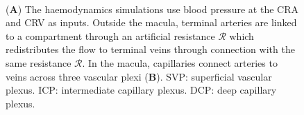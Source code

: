 \documentclass[11pt,]{article}
\begin{document}
\begin{figure}[ht!]
  \centering
  \begin{subfigure}[t]{.02\textwidth}
  \end{subfigure}
  \begin{subfigure}[t]{.95\textwidth}
    {
      \fontsize{3pt}{4pt}\selectfont%
      \def\svgwidth{\textwidth}    
    }
  \end{subfigure}
  \\
  \begin{subfigure}[t]{.02\textwidth}
  \end{subfigure}
  \begin{subfigure}[t]{.95\textwidth}
  \end{subfigure}

  \caption{ %
    (\textbf{A}) The haemodynamics simulations use blood pressure at the CRA and CRV as inputs.
    Outside the macula, terminal arteries are linked to a compartment through an artificial resistance $\mathcal{R}$
    which redistributes the flow to terminal veins through connection with the same resistance $\mathcal{R}$.
    In the macula, capillaries connect arteries to veins across three vascular plexi (\textbf{B}).
    SVP: superficial vascular plexus. ICP: intermediate capillary plexus. DCP: deep capillary plexus.
  }
  \label{fig:fig2}
\end{figure}
\end{document}
